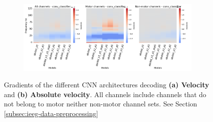 \begin{figure}[!htpb]
\begin{subfigure}[d]{\textwidth}
   \includegraphics[width=1\linewidth]{img/appendix/A/conv-classifier/m/absVel-model-gradients_all_kinds}
   \caption{}
   \label{fig:absVel-full-grads-conv-classifier}
\end{subfigure}

\caption[]{Gradients of the different CNN architectures decoding \textbf{(a) Velocity} and \textbf{(b) Absolute velocity}. All channels include channels that do not belong to motor neither non-motor channel sets. See Section \ref{subsec:ieeg-data-preprocessing}}
\label{fig:absVel-full-grads}
\end{figure}


